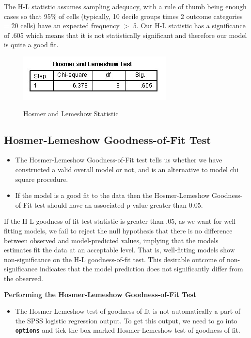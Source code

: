 \documentclass[a4paper,12pt]{article}
\begin{document}
The H-L statistic assumes sampling adequacy, with a rule of thumb being enough cases so that 95\% of cells (typically, 10 decile groups times 2 outcome categories = 20 cells) have an expected frequency $>$ 5. Our H-L statistic has a significance of .605 which means that it is not statistically significant and therefore our model is quite a
good fit.
\begin{figure}[h!]
	\begin{center}
		\includegraphics[scale=0.6]{images/Logistic7A}\\
		\caption{Hosmer and Lemeshow Statistic}
	\end{center}
\end{figure}

\newpage
\subsection{Hosmer-Lemeshow Goodness-of-Fit Test}
\begin{framed}
	\begin{itemize}
		\item The Hosmer-Lemeshow Goodness-of-Fit
		test tells us whether we have constructed a valid overall model or not, and is an alternative to model chi square procedure.
		\item If the model is a good fit to the data then the Hosmer-Lemeshow Goodness-of-Fit test should have an associated p-value greater than 0.05.
	\end{itemize} 
\end{framed}
If the H-L goodness-of-fit test statistic is greater than .05, as we want for well-fitting models, we fail to reject the null hypothesis that there is no difference between observed and model-predicted values, implying that the models estimates fit the data at an acceptable level. That is, well-fitting models show non-significance on the
H-L goodness-of-fit test. This desirable outcome of non-significance indicates that the
model prediction does not significantly differ from the observed.

\noindent \textbf{Performing the Hosmer-Lemeshow Goodness-of-Fit Test} 	
\begin{itemize}	
	\item 	
	The Hosmer-Lemeshow test of goodness of fit is not automatically a part of the SPSS logistic regression output. 
	To get this output, we need to go into \textbf{\texttt{options}} and tick the box marked Hosmer-Lemeshow test of goodness of fit. 
\end{itemize}
\end{document}
